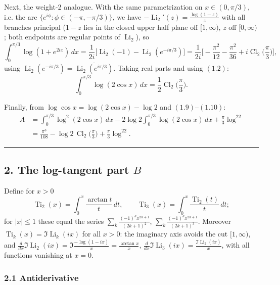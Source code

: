 \documentclass[11pt]{article}
\theoremstyle{remark}
\begin{document}
Next, the weight-2 analogue. With the same parametrization on $x\in(0,\pi/3)$, i.e. the arc $\{e^{i\phi}:\phi\in(-\pi,-\pi/3)\}$, we have $-\operatorname{Li}_2'(z)=\frac{\log(1-z)}{z}$ with all branches principal ($1-z$ lies in the closed upper half plane off $[1,\infty)$, $z$ off $[0,\infty)$; both endpoints are regular points of $\operatorname{Li}_2$), so
\[
\int_0^{\pi/3}\log(1+e^{2ix})\,dx=\frac{1}{2i}\Big[\operatorname{Li}_2(-1)-\operatorname{Li}_2(e^{-i\pi/3})\Big]
=\frac{1}{2i}\Big[-\frac{\pi^2}{12}-\frac{\pi^2}{36}+i\operatorname{Cl}_2\!\Big(\frac\pi3\Big)\Big],
\]
using $\operatorname{Li}_2(e^{-i\pi/3})=\overline{\operatorname{Li}_2(e^{i\pi/3})}$. Taking real parts and using $(1.2)$:
\begin{equation*}
\int_0^{\pi/3}\log(2\cos x)\,dx=\frac12\operatorname{Cl}_2\!\Big(\frac\pi3\Big). \tag{1.10}
\end{equation*}

Finally, from $\log\cos x=\log(2\cos x)-\log2$ and $(1.9)$--$(1.10)$:
\begin{equation*}
\begin{aligned}
A&=\int_0^{\pi/3}\log^2(2\cos x)\,dx-2\log2\int_0^{\pi/3}\log(2\cos x)\,dx+\frac{\pi}{3}\log^22\\
&=\frac{\pi^3}{108}-\log2\,\operatorname{Cl}_2\!\Big(\frac\pi3\Big)+\frac{\pi}{3}\log^22.
\end{aligned}
\tag{1.11}
\end{equation*}

\begin{center}\rule{0.6\textwidth}{0.4pt}\end{center}

\subsection*{2. The log-tangent part $B$}

Define for $x>0$
\[
\operatorname{Ti}_2(x)=\int_0^x\frac{\arctan t}{t}\,dt,\qquad \operatorname{Ti}_3(x)=\int_0^x\frac{\operatorname{Ti}_2(t)}{t}\,dt;
\]
for $|x|\le1$ these equal the series $\sum_k\frac{(-1)^kx^{2k+1}}{(2k+1)^{2}}$, $\sum_k\frac{(-1)^kx^{2k+1}}{(2k+1)^{3}}$. Moreover $\operatorname{Ti}_k(x)=\Im\operatorname{Li}_k(ix)$ for all $x>0$: the imaginary axis avoids the cut $[1,\infty)$, and $\frac{d}{dx}\Im\operatorname{Li}_2(ix)=\Im\frac{-\log(1-ix)}{x}=\frac{\arctan x}{x}$, $\frac{d}{dx}\Im\operatorname{Li}_3(ix)=\frac{\Im\operatorname{Li}_2(ix)}{x}$, with all functions vanishing at $x=0$.

\subsubsection*{2.1 Antiderivative}
\end{document}
